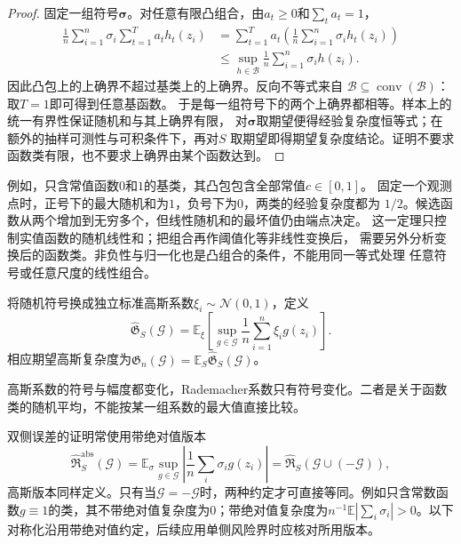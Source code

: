 \begin{proof}
固定一组符号$\bm\sigma$。对任意有限凸组合，由$a_t\geq0$和$\sum_ta_t=1$，
\[
 \begin{aligned}
 \frac1n\sum_{i=1}^n\sigma_i\sum_{t=1}^T a_t h_t(z_i)
 &=\sum_{t=1}^T a_t
    \left(\frac1n\sum_{i=1}^n\sigma_i h_t(z_i)\right)\\
 &\leq\sup_{h\in\mathcal B}\frac1n\sum_{i=1}^n\sigma_i h(z_i).
 \end{aligned}
\]
因此凸包上的上确界不超过基类上的上确界。反向不等式来自
$\mathcal B\subseteq\operatorname{conv}(\mathcal B)$：取$T=1$即可得到任意基函数。
于是每一组符号下的两个上确界都相等。样本上的统一有界性保证随机和与其上确界有限，
对$\bm\sigma$取期望便得经验复杂度恒等式；在额外的抽样可测性与可积条件下，再对$S$
取期望即得期望复杂度结论。证明不要求函数类有限，也不要求上确界由某个函数达到。
\end{proof}

例如，只含常值函数$0$和$1$的基类，其凸包包含全部常值$c\in[0,1]$。
固定一个观测点时，正号下的最大随机和为$1$，负号下为$0$，两类的经验复杂度都为
$1/2$。候选函数从两个增加到无穷多个，但线性随机和的最坏值仍由端点决定。
这一定理只控制实值函数的随机线性和；把组合再作阈值化等非线性变换后，
需要另外分析变换后的函数类。非负性与归一化也是凸组合的条件，不能用同一等式处理
任意符号或任意尺度的线性组合。

\begin{definition}[经验高斯复杂度]
  \label{def:gaussian-complexity}
  将随机符号换成独立标准高斯系数\(\xi_i\sim\mathcal N(0,1)\)，定义
  \[
    \widehat{\mathfrak G}_S(\mathcal G)
    =\mathbb E_\xi\left[\sup_{g\in\mathcal G}\frac1n\sum_{i=1}^n\xi_i g(z_i)\right].
  \]
  相应期望高斯复杂度为\(\mathfrak G_n(\mathcal G)=\mathbb E_S\widehat{\mathfrak G}_S(\mathcal G)\)。
\end{definition}
高斯系数的符号与幅度都变化，Rademacher系数只有符号变化。二者是关于函数类的随机平均，不能按某一组系数的最大值直接比较。

双侧误差的证明常使用带绝对值版本
\[
  \widehat{\mathfrak R}^{\mathrm{abs}}_S(\mathcal G)
  =\mathbb E_\sigma\sup_{g\in\mathcal G}\left|\frac1n\sum_i\sigma_i g(z_i)\right|
  =\widehat{\mathfrak R}_S(\mathcal G\cup(-\mathcal G)),
\]
高斯版本同样定义。只有当\(\mathcal G=-\mathcal G\)时，两种约定才可直接等同。例如只含常数函数\(g\equiv1\)的类，其不带绝对值复杂度为\(0\)；带绝对值复杂度为\(n^{-1}\mathbb E|\sum_i\sigma_i|>0\)。以下对称化沿用带绝对值约定，后续应用单侧风险界时应核对所用版本。

